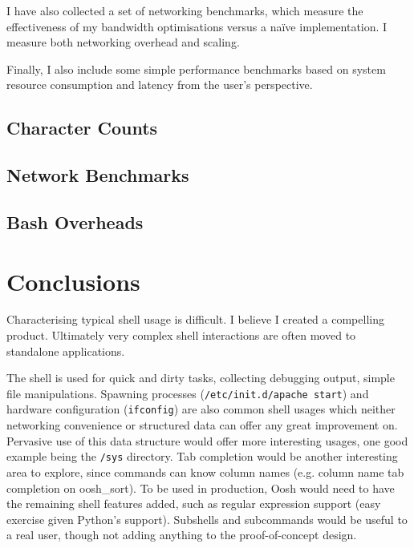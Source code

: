 \documentclass[12pt,twoside,notitlepage]{report}
\begin{document}
I have also collected a set of networking benchmarks, which measure the
effectiveness of my bandwidth optimisations versus a na\"{i}ve implementation. I
measure both networking overhead and scaling.

Finally, I also include some simple performance benchmarks based on system
resource consumption and latency from the user's perspective.

\section{Character Counts}

\section{Network Benchmarks}

\section{Bash Overheads}



\cleardoublepage
\chapter{Conclusions}


Characterising typical shell usage is difficult. I believe I created a
compelling product. Ultimately very complex shell interactions are often moved
to standalone applications. %

The shell is used for quick and dirty tasks, collecting debugging output, simple
file manipulations. Spawning processes ({\tt /etc/init.d/apache start}) and
hardware configuration ({\tt ifconfig}) are also common shell usages which
neither networking convenience or structured data can offer any great
improvement on. Pervasive use of this data structure would offer more
interesting usages, one good example being the {\tt /sys} directory. Tab
completion would be another interesting area to explore, since commands can know
column names (e.g. column name tab completion on oosh\_sort). To be used in
production, Oosh would need to have the remaining shell features added, such as
regular expression support (easy exercise given Python's support). Subshells and
subcommands would be useful to a real user, though not adding anything to the
proof-of-concept design.
\end{document}
